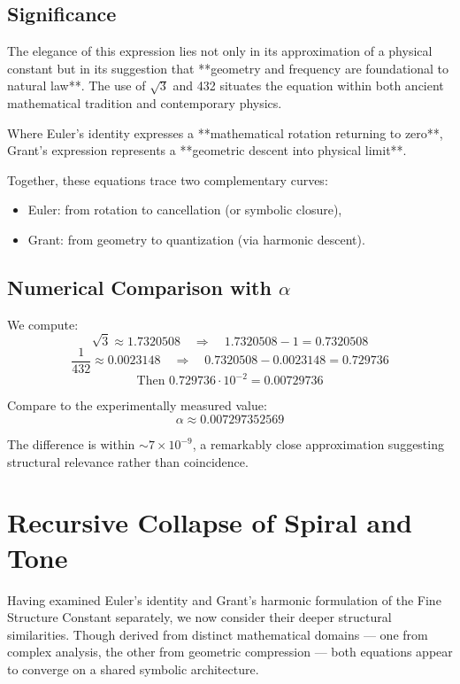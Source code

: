 \documentclass[12pt]{article}
\begin{document}
\subsection*{Significance}

The elegance of this expression lies not only in its approximation of a physical constant but in its suggestion that **geometry and frequency are foundational to natural law**. The use of \( \sqrt{3} \) and 432 situates the equation within both ancient mathematical tradition and contemporary physics.

Where Euler’s identity expresses a **mathematical rotation returning to zero**, Grant’s expression represents a **geometric descent into physical limit**.

Together, these equations trace two complementary curves:

\begin{itemize}[leftmargin=1.5em]
    \item Euler: from rotation to cancellation (or symbolic closure),
    \item Grant: from geometry to quantization (via harmonic descent).
\end{itemize}


\subsection*{Numerical Comparison with \(\alpha\)}

We compute:
\[
\sqrt{3} \approx 1.7320508
\quad \Rightarrow \quad
1.7320508 - 1 = 0.7320508
\]
\[
\frac{1}{432} \approx 0.0023148
\quad \Rightarrow \quad
0.7320508 - 0.0023148 = 0.729736
\]
\[
\text{Then } 0.729736 \cdot 10^{-2} = 0.00729736
\]

Compare to the experimentally measured value:
\[
\alpha \approx 0.007297352569
\]

The difference is within \( \sim 7 \times 10^{-9} \), a remarkably close approximation suggesting structural relevance rather than coincidence.

\newpage
\section{Recursive Collapse of Spiral and Tone}

Having examined Euler’s identity and Grant’s harmonic formulation of the Fine Structure Constant separately, we now consider their deeper structural similarities. Though derived from distinct mathematical domains — one from complex analysis, the other from geometric compression — both equations appear to converge on a shared symbolic architecture.
\end{document}
